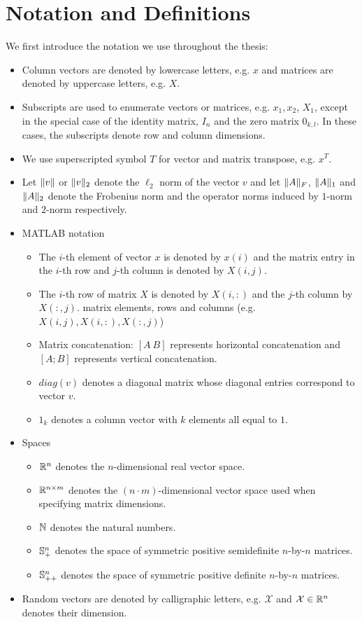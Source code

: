 %
\chapter{Notation and Definitions}\label{chap:notation}

We first introduce the notation we use throughout the thesis:
\begin{itemize}
\item Column vectors are denoted by lowercase letters, e.g. $x$ and matrices are denoted by uppercase letters, e.g. $X$.
\item Subscripts are used to enumerate vectors or matrices, e.g. $x_1, x_2$, $X_1$, except in the
special case of the identity matrix, $I_n$ and the zero matrix $0_{k,l}$. In these cases, the subscripts denote row and column dimensions.
\item We use superscripted symbol $T$ for vector and matrix transpose, e.g. $x^T$.
\item Let $\lVert v\rVert$ or $\lVert v\rVert_2$ denote the $\ell_2$ norm of the vector $v$ and let 
$\lVert A\rVert_F$, $\lVert A\rVert_1$ and $\lVert A\rVert_2$ denote the Frobenius norm and the operator norms induced by $1$-norm and $2$-norm respectively.
\item MATLAB notation~\cite{golub}
\begin{itemize}
\item The $i$-th element of vector $x$ is denoted by $x(i)$ and the matrix entry in the $i$-th row and $j$-th column is denoted by $X(i,j)$.
\item The $i$-th row of matrix $X$ is denoted by $X(i,:)$ and the $j$-th column by $X(:,j)$.
 matrix elements, rows and columns {(e.g. ${X(i,j), X(i,:), X(:,j)}$)}
\item Matrix concatenation: $[A~B]$ represents horizontal concatenation and $[A; B]$ represents vertical concatenation.
\item $diag(v)$ denotes a diagonal matrix whose diagonal entries correspond to vector $v$.
\item $1_k$ denotes a column vector with $k$ elements all equal to $1$.
\end{itemize}
\item Spaces
\begin{itemize}
 \item $\mathbb{R}^n$ denotes the $n$-dimensional real vector space.
 \item $\mathbb{R}^{n\times m}$ denotes the $(n \cdot m)$-dimensional vector space used when specifying
 matrix dimensions.
 \item $\mathbb{N}$ denotes the natural numbers.
 \item $\mathbb{S}_{+}^n$ denotes the space of symmetric positive semidefinite $n$-by-$n$ matrices.
 \item $\mathbb{S}_{++}^n$ denotes the space of symmetric positive definite $n$-by-$n$ matrices.
\end{itemize}
\item Random vectors are denoted by calligraphic letters, e.g. $\mathcal{X}$ and $\mathcal{X} \in \mathbb{R}^n$ denotes their dimension.
\end{itemize}


